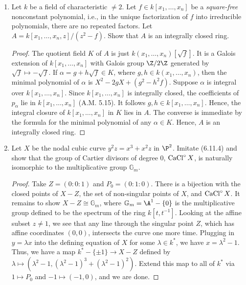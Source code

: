 \documentclass[a4paper]{article}
\begin{document}
\begin{enumerate} [label=\textbf{\arabic*.}, leftmargin=0em]
\item [\textbf{4.}] Let $k$ be a field of characteristic $\neq 2$. Let $f \in k[x_1, \dots, x_n]$ be a \textit{square-free} nonconstant polynomial, i.e., in the unique factorization of $f$ into irreducible polynomials, there are no repeated factors. Let $A = k[x_1, \dots, x_n, z] / (z^2 - f)$. Show that $A$ is an integrally closed ring.

\begin{proof}
    The quotient field $K$ of $A$ is just $k(x_1, \dots, x_n)[\sqrt{f}]$.
    It is a Galois extension of $k[x_1, \dots, x_n]$ with Galois group $\Z / 2 \Z$ generated by $\sqrt{f} \mapsto -\sqrt{f}$.
    If $\alpha = g + h \sqrt{f} \in K$, where $g, h \in k(x_1, \dots, x_n)$, then the minimal polynomial of $\alpha$ is $X^2 - 2g X + (g^2 - h^2f)$. Suppose $\alpha$ is integral over $k[x_1, \dots, x_n]$. Since $k[x_1, \dots, x_n]$ is integrally closed, the coefficients of $p_\alpha$ lie in $k[x_1, \dots, x_n]$ (A.M. 5.15). It follows $g, h \in k[x_1, \dots, x_n]$. Hence, the integral closure of $k[x_1, \dots, x_n]$ in $K$ lies in $A$. The converse is immediate by the formula for the minimal polynomial of any $\alpha \in K$. Hence, $A$ is an integrally closed ring.
\end{proof}

\item[\textbf{7.}] Let $X$ be the nodal cubic curve $y^2 z = x^3 + x^2 z$ in $\P^2$. Imitate (6.11.4) and show that the group of Cartier divisors of degree $0$, $\operatorname{CaCl}^\circ X$, is naturally isomorphic to the multiplicative group $\mathbb{G}_m$.

\begin{proof}
   Take $Z = (0:0:1)$ and $P_0 = (0:1:0)$.
   There is a bijection with the closed points of $X - Z$, the set of non-singular points of $X$, and $\operatorname{CaCl}^\circ X$.
   It remains to show $X - Z \cong \mathbb{G}_m$, where $\mathbb{G}_m = \A^1 - \{ 0 \}$ is the multiplicative group defined to be the spectrum of the ring $k[t, t^{-1}]$.
   Looking at the affine subset $z \neq 1$, we see that any line through the singular point $Z$, which has affine coordinates $(0, 0)$, intersects the curve one more time. 
   Plugging in $y = \lambda x$ into the defining equation of $X$ for some $\lambda \in k^*$, we have $x = \lambda^2  - 1$.
   Thus, we have a map $k^* - \{ \pm 1 \} \to X - Z$ defined by $\lambda \mapsto (\lambda^2 - 1, (\lambda^2 - 1)^3 + (\lambda^2 - 1)^2)$.
   Extend this map to all of $k^*$ via $1 \mapsto P_0$ and $-1 \mapsto (-1, 0)$, and we are done.
\end{proof}


\end{enumerate}
\end{document}
